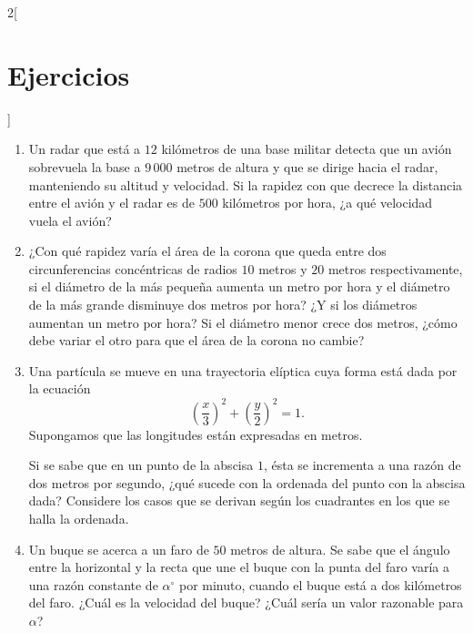 \begin{multicols}{2}[\section{Ejercicios}]
\begin{enumerate}[leftmargin=*]
\item Un radar que está a $12$ kilómetros de una base militar detecta que un avión sobrevuela
    la base a $9\,000$ metros de altura y que se dirige hacia el radar, manteniendo su altitud
    y velocidad. Si la rapidez con que decrece la distancia entre el avión y el radar es de
    $500$ kilómetros por hora, ¿a qué velocidad vuela el avión?

\item ¿Con qué rapidez varía el área de la corona que queda entre dos circunferencias
    concéntricas de radios $10$ metros y $20$ metros respectivamente, si el diámetro de la más
    pequeña aumenta un metro por hora y el diámetro de la más grande disminuye dos metros por
    hora? ¿Y si los diámetros aumentan un metro por hora? Si el diámetro menor crece dos
    metros, ¿cómo debe variar el otro para que el área de la corona no cambie?

\item Una partícula se mueve en una trayectoria elíptica cuya forma está dada por la ecuación
    \[
      \left(\frac{x}{3}\right)^2 + \left(\frac{y}{2}\right)^2 = 1.
    \]
    Supongamos que las longitudes están expresadas en metros.

    Si se sabe que en un punto de la abscisa $1$, ésta se incrementa a una razón de dos metros
    por segundo, ¿qué sucede con la ordenada del punto con la abscisa dada? Considere los casos
    que se derivan según los cuadrantes en los que se halla la ordenada.

\item Un buque se acerca a un faro de $50$ metros de altura. Se sabe que el ángulo entre la
    horizontal y la recta que une el buque con la punta del faro varía a una razón constante de
    $\alpha^\circ$ por minuto, cuando el buque está a dos kilómetros del faro. ¿Cuál es la
    velocidad del buque? ¿Cuál sería un valor razonable para $\alpha$?
\end{enumerate}
\endgroup
\end{multicols}


